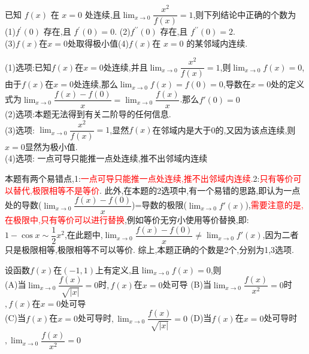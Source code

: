 \documentclass[8pt a4paper, oneside, UTF8]{ctexbook}  %
\begin{document}
\begin{sloppypar}
\begin{note}
    \end{note}
    \begin{problem}
        已知 $f(x)$ 在 $x=0$ 处连续,且$\lim_{x\to 0}\dfrac{x^2}{f(x)}=1$,则下列结论中正确的个数为\\
        (1)$f^{\prime}(0)$ 存在,且 $f^\prime(0)=0.$ \quad (2)$f^{\prime\prime}(0)$ 存在,且 $f^{\prime\prime}(0)=2.$\\
        (3)$f(x)$在$x=0$处取得极小值\quad (4)$f\left(x\right)$在 $x=0$ 的某邻域内连续.
    \end{problem}
    \begin{solution}
        (1)选项:已知$f(x)$在$x=0$处连续,并且$\lim_{x\to 0}\dfrac{x^2}{f(x)}=1$,则$\lim_{x\to 0}f(x) =0$,由于$f(x)$在$x=0$处连续,那么$\lim_{x \to 0}f(x)=f(0)=0$,导数在$x=0$处的定义式为$\lim_{x\to 0}\dfrac{f(x)-f(0)}{x}=\lim_{x\to 0} \dfrac{f(x)}{x}$.那么$f'(0)=0$\\
        (2)选项:本题无法得到有关二阶导的任何信息.\\
        (3)选项: $\lim_{x\to 0} \dfrac{x^2}{f(x)}=1$,显然$f(x)$在邻域内是大于0的,又因为该点连续,则$x=0$显然为极小值. \\
        (4)选项: 一点可导只能推一点处连续,推不出邻域内连续
    \end{solution}
    \begin{note}
        本题有两个易错点,1:\textcolor{red}{一点可导只能推一点处连续,推不出邻域内连续.}2:\textcolor{red}{只有等价可以替代,极限相等不是等价}.\newline
        此外,在本题的2选项中,有一个易错的思路,即认为一点处的导数($\lim_{x\to 0}\dfrac{f(x)-f(0)}{x}$)=导数的极限($\lim_{x\to 0}f'(x)$),\textcolor{red}{需要注意的是,在极限中,只有等价可以进行替换},例如等价无穷小使用等价替换,即:$1-\cos x \sim \dfrac{1}{2}x^2$,在此题中,$\lim_{x\to 0}\dfrac{f(x)-f(0)}{x} \neq \lim_{x\to 0}f'(x)$,因为二者只是极限相等,极限相等不可以等价.
        综上,本题正确的个数是2个,分别为1,3选项.
    \end{note}
    \begin{problem}
        设函数$f(x)$在$(-1,1)$上有定义,且$\lim_{x\to0}f(x)=0$,则\\
        (A)当$\lim_{x\to 0}\dfrac{f(x)}{\sqrt{|x|}}=0$时$,f(x)$在$x=0$处可导
        (B)当$\lim_{x\to 0}\dfrac{f(x)}{x^{2}}=0$时$,f(x)$在$x=0$处可导\\
        (C)当$f(x)$在$x=0$处可导时$,\lim_{x\to0}\dfrac{f(x)}{\sqrt{|x|}}=0$\quad
        (D)当$f(x)$在$x=0$处可导时$,\lim_{x\to0}\dfrac{f(x)}{x^{2}}=0$        
    \end{problem}
    \begin{solution}

\end{solution}
\end{sloppypar}
\end{document}
